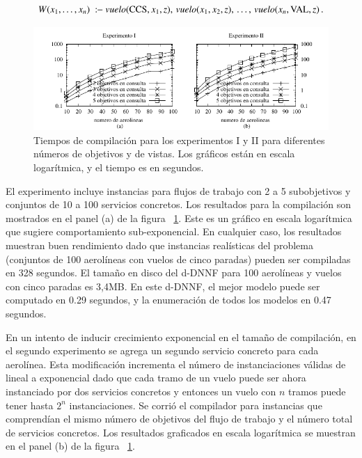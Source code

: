 \[ W(x_1,\ldots,x_n)\ \qrule\ \vuelo(\PA,x_1,z),\,\vuelo(x_1,x_2,z),\,\ldots,\,\vuelo(x_n,\NY,z)\,. \]

\begin{figure}[t]
\centering
\includegraphics[width=1\textwidth]{graphics/plot1}
\caption{Tiempos de compilación para los experimentos I y II para diferentes
números de objetivos y de vistas. Los gráficos están en escala logarítmica, y el
tiempo es en segundos.}
\label{fig:plot1}
\end{figure}

El experimento incluye instancias para flujos de trabajo con 2 a 5 subobjetivos
y conjuntos de 10 a 100 servicios concretos. Los resultados para la compilación
son mostrados en el panel (a) de la figura ~\ref{fig:plot1}. Este es un gráfico en escala
logarítmica que sugiere comportamiento sub-exponencial. En cualquier caso, los
resultados muestran buen rendimiento dado que instancias realísticas del
problema (conjuntos de 100 aerolíneas con vuelos de cinco paradas) pueden ser
compiladas en 328 segundos. El tamaño en disco del d-DNNF para 100 aerolíneas y
vuelos con cinco paradas es 3,4MB. En este d-DNNF, el mejor modelo puede ser
computado en 0.29 segundos, y la enumeración de todos los modelos en 0.47
segundos.

En un intento de inducir crecimiento exponencial en el tamaño de compilación, en
el segundo experimento se agrega un segundo servicio concreto para cada
aerolínea. Esta modificación incrementa el número de instanciaciones válidas de
lineal a exponencial dado que cada tramo de un vuelo puede ser ahora instanciado
por dos servicios concretos y entonces un vuelo con $n$ tramos puede tener hasta
$2^n$ instanciaciones. Se corrió el compilador para instancias que comprendían
el mismo número de objetivos del flujo de trabajo y el número total de
servicios concretos. Los resultados graficados en escala logarítmica se muestran
en el panel (b) de la figura ~\ref{fig:plot1}.

